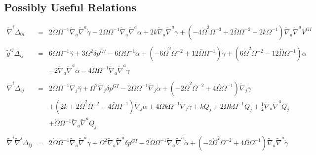 \documentclass[10pt,letterpaper]{article}
\numberwithin{equation}{section}
\begin{document}
\begin{appendices}
\section{Possibly Useful Relations}
\begin{eqnarray}
\tilde\nabla^i\Delta_{0i}&=& 2 \dot{\Omega} \Omega^{-1} \tilde{\nabla}_{a}\tilde{\nabla}^{a}\dot{\gamma} - 2 \dot{\Omega} \Omega^{-1} \tilde{\nabla}_{a}\tilde{\nabla}^{a}\alpha + 2 k \tilde{\nabla}_{a}\tilde{\nabla}^{a}\gamma +(-4 \dot{\Omega}^2 \Omega^{-3} + 2 \overset{..}{\Omega} \Omega^{-2} - 2 k \Omega^{-1}) \tilde{\nabla}_{a}\tilde{\nabla}^{a}V^{GI}{}
\\  \nonumber\\ 
\tilde g^{ij}\Delta_{ij}&=& 6 \dot{\Omega} \Omega^{-1} \overset{..}{\gamma} + 3 \Omega^2 \delta p^{GI}{} - 6 \dot{\Omega} \Omega^{-1} \dot{\alpha} + (-6 \dot{\Omega}^2 \Omega^{-2} + 12 \overset{..}{\Omega} \Omega^{-1}) \dot{\gamma} + (6 \dot{\Omega}^2 \Omega^{-2} - 12 \overset{..}{\Omega} \Omega^{-1}) \alpha \nonumber \\ 
&& - 2 \tilde{\nabla}_{a}\tilde{\nabla}^{a}\alpha - 4 \dot{\Omega} \Omega^{-1} \tilde{\nabla}_{a}\tilde{\nabla}^{a}\gamma 
\\  \nonumber\\ 
\tilde\nabla^i\Delta_{ij}&=& 2 \dot{\Omega} \Omega^{-1} \tilde{\nabla}_{j}\overset{..}{\gamma} + \Omega^2 \tilde{\nabla}_{j}\delta p^{GI}{} - 2 \dot{\Omega} \Omega^{-1} \tilde{\nabla}_{j}\dot{\alpha} + (-2 \dot{\Omega}^2 \Omega^{-2} + 4 \overset{..}{\Omega} \Omega^{-1}) \tilde{\nabla}_{j}\dot{\gamma} \nonumber \\ 
&& + (2 k + 2 \dot{\Omega}^2 \Omega^{-2} - 4 \overset{..}{\Omega} \Omega^{-1}) \tilde{\nabla}_{j}\alpha + 4 \dot{\Omega} k \Omega^{-1} \tilde{\nabla}_{j}\gamma +k \dot{Q}_{j} + 2 \dot{\Omega} k \Omega^{-1} Q_{j} + \tfrac{1}{2} \tilde{\nabla}_{a}\tilde{\nabla}^{a}\dot{Q}_{j} \nonumber \\ 
&& + \dot{\Omega} \Omega^{-1} \tilde{\nabla}_{a}\tilde{\nabla}^{a}Q_{j}
\\  \nonumber\\ 
\tilde\nabla^i\tilde\nabla^j\Delta_{ij}&=& 2 \dot{\Omega} \Omega^{-1} \tilde{\nabla}_{a}\tilde{\nabla}^{a}\overset{..}{\gamma} + \Omega^2 \tilde{\nabla}_{a}\tilde{\nabla}^{a}\delta p^{GI}{} - 2 \dot{\Omega} \Omega^{-1} \tilde{\nabla}_{a}\tilde{\nabla}^{a}\dot{\alpha} + (-2 \dot{\Omega}^2 \Omega^{-2} + 4 \overset{..}{\Omega} \Omega^{-1}) \tilde{\nabla}_{a}\tilde{\nabla}^{a}\dot{\gamma} \nonumber \\ 

\end{eqnarray}
\end{appendices}
\end{document}
